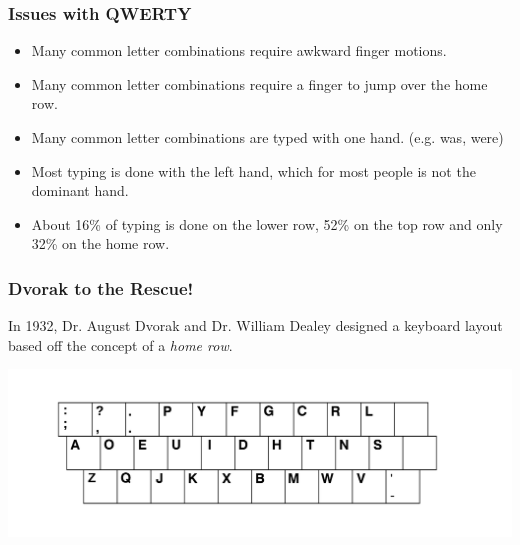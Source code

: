 \documentclass{beamer}
\begin{document}
\begin{frame}
    \frametitle{Issues with QWERTY}
    \begin{itemize}[<+->]
        \item Many common letter combinations require awkward finger motions.
        \item Many common letter combinations require a finger to jump over the home row.
        \item Many common letter combinations are typed with one hand. (e.g. was, were)
        \item Most typing is done with the left hand, which for most people is not the dominant hand.
        \item About 16\% of typing is done on the lower row, 52\% on the top
            row and only 32\% on the home row.
    \end{itemize}
\end{frame}

\begin{frame}
    \frametitle{Dvorak to the Rescue!}
    In 1932, Dr. August Dvorak and Dr. William Dealey designed a keyboard
    layout based off the concept of a \emph{home row}.
    \begin{center}
        \includegraphics[width=\linewidth]{graphics/originaldvorak}
    \end{center}
\end{frame}
\end{document}
